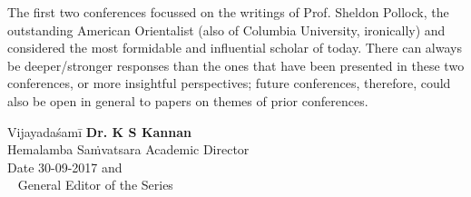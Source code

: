 The first two conferences focussed on the writings of Prof. Sheldon Pollock, the outstanding American Orientalist (also of Columbia University, ironically) and considered the most formidable and influential scholar of today. There can always be deeper/stronger responses than the ones that have been presented in these two conferences, or more insightful perspectives; future conferences, therefore, could also be open in general to papers on themes of prior conferences.

\vskip 1cm

Vijayadaśamī \hfill \textbf{Dr. K S Kannan}\\
Hemalamba Saṁvatsara \hfill Academic Director\\
Date 30-09-2017 \hfill and\\
\phantom{a}~ \hfill General Editor of the Series
